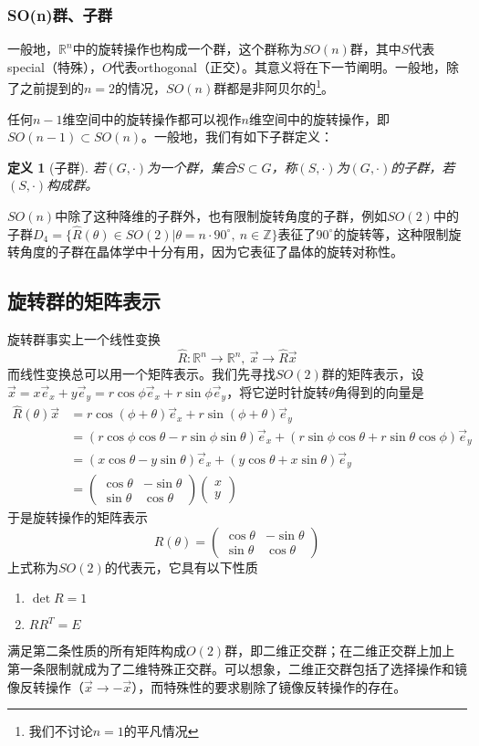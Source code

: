\documentclass[a4paper,11pt]{ctexart}
\newcommand{\beq}{\begin{equation}}
\newcommand{\eeq}{\end{equation}}
\newcommand{\bea}{\begin{equation}\begin{aligned}}
\newcommand{\eea}{\end{aligned}\end{equation}}
\newcommand{\reals}{\mathbb{R}}
\newcommand{\ints}{\mathbb{Z}}
\newtheorem{dfn}{定义}[section]
\begin{document}
\subsubsection{SO(n)群、子群}
一般地，$\reals^n$中的旋转操作也构成一个群，这个群称为$SO(n)$群，其中$S$代表special（特殊），$O$代表orthogonal（正交）。其意义将在下一节阐明。一般地，除了之前提到的$n=2$的情况，$SO(n)$群都是非阿贝尔的\footnote{我们不讨论$n=1$的平凡情况}。\par
任何$n-1$维空间中的旋转操作都可以视作$n$维空间中的旋转操作，即$SO(n-1) \subset SO(n)$。一般地，我们有如下子群定义：
\begin{dfn}[子群]
若$(G,\cdot)$为一个群，集合$S \subset G$，称$(S,\cdot)$为$(G,\cdot)$的子群，若$(S,\cdot)$构成群。
\end{dfn}
$SO(n)$中除了这种降维的子群外，也有限制旋转角度的子群，例如$SO(2)$中的子群$D_4 = \{ \hat{R}(\theta) \in SO(2) | \theta = n\cdot 90^\circ,\ n \in \ints \}$表征了$90^\circ$的旋转等，这种限制旋转角度的子群在晶体学中十分有用，因为它表征了晶体的旋转对称性。 

\subsection{旋转群的矩阵表示}
旋转群事实上一个线性变换
\beq
\hat{R}: \reals^n \to \reals^n,\ \vec{x} \to \hat{R} \vec{x}
\eeq
而线性变换总可以用一个矩阵表示。我们先寻找$SO(2)$群的矩阵表示，设$\vec{x} = x \vec{e}_x + y \vec{e}_y = r\cos \phi \vec{e}_x + r\sin \phi \vec{e}_y$，将它逆时针旋转$\theta$角得到的向量是
\bea
\hat{R}(\theta) \vec{x} &= r \cos(\phi + \theta) \vec{e}_x + r \sin(\phi + \theta) \vec{e}_y \\
&= (r\cos \phi \cos \theta - r \sin \phi \sin \theta)\vec{e}_x + (r \sin \phi \cos \theta + r \sin \theta \cos \phi) \vec{e}_y \\
&= (x \cos \theta - y \sin \theta) \vec{e}_x + (y \cos \theta + x \sin \theta) \vec{e}_y \\
&= \begin{pmatrix}
\cos \theta & - \sin \theta \\
\sin \theta & \cos \theta
\end{pmatrix}
\begin{pmatrix}
x \\
y
\end{pmatrix}
\eea
于是旋转操作的矩阵表示
\beq
R(\theta) = \begin{pmatrix}
\cos \theta & - \sin \theta \\
\sin \theta & \cos \theta
\end{pmatrix}
\eeq
上式称为$SO(2)$的代表元，它具有以下性质
\begin{enumerate}
\item $\det R = 1$
\item $RR^T = E$
\end{enumerate}
满足第二条性质的所有矩阵构成$O(2)$群，即二维正交群；在二维正交群上加上第一条限制就成为了二维特殊正交群。可以想象，二维正交群包括了选择操作和镜像反转操作（$\vec{x} \to -\vec{x}$），而特殊性的要求剔除了镜像反转操作的存在。
\end{document}
